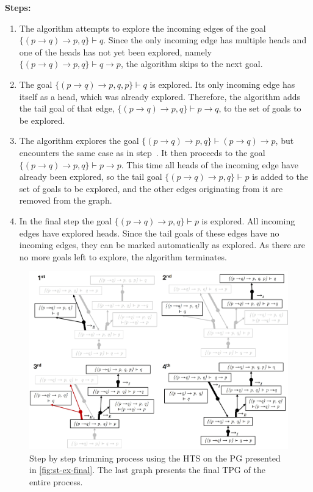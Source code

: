 \vspace{0.5em}
\textbf{Steps:}

\begin{enumerate}
    \item[\textbf{\ordinalnum{1}}] The algorithm attempts to explore the incoming edges of the goal \(\{(p \to q) \to p, q\} \vdash q\). Since the only incoming edge has multiple heads and one of the heads has not yet been explored, namely \(\{(p \to q) \to p, q\} \vdash q \to p\), the algorithm skips to the next goal. 
    
    \item[\textbf{\ordinalnum{2}}] The goal \(\{(p \to q) \to p, q, p\} \vdash q\) is explored. Its only incoming edge has itself as a head, which was already explored. Therefore, the algorithm adds the tail goal of that edge, \(\{(p \to q) \to p, q\} \vdash p \to q\), to the set of goals to be explored. 
    
    \item[\textbf{\ordinalnum{3}}] The algorithm explores the goal \(\{(p \to q) \to p, q\} \vdash (p \to q) \to p\), but encounters the same case as in step~. It then proceeds to the goal \(\{(p \to q) \to p, q\} \vdash p \to p\). This time all heads of the incoming edge have already been explored, so the tail goal \(\{(p \to q) \to p, q\} \vdash p\) is added to the set of goals to be explored, and the other edges originating from it are removed from the graph. 
    
    \item[\textbf{\ordinalnum{4}}] In the final step the goal \(\{(p \to q) \to p, q\} \vdash p\) is explored. All incoming edges have explored heads. Since the tail goals of these edges have no incoming edges, they can be marked automatically as explored. As there are no more goals left to explore, the algorithm terminates.
\end{enumerate}

\begin{figure}[h]
    \centering
    \includegraphics[width=1\linewidth]{Chapters/Figures/trim-gen.jpg}
    \caption{Step by step trimming process using the HTS on the PG presented in \autoref{fig:st-ex-final}. The last graph presents the final TPG of the entire process.}
    \label{fig:sg-trim-height}
\end{figure}

